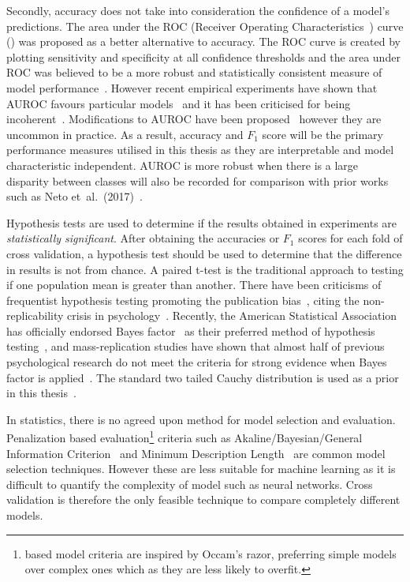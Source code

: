 \documentclass[12pt, twoside]{book}
\renewcommand\emph[1]{\textit{\color{USred}{#1}}}
\begin{document}
Secondly, accuracy does not take into consideration the confidence of a model's predictions. The area under the ROC (Receiver Operating Characteristics~\cite{rocauc}) curve (\emph{AUROC}) was proposed as a better alternative to accuracy. The ROC curve is created by plotting sensitivity and specificity at all confidence thresholds and the area under ROC was believed to be a more robust and statistically consistent measure of model performance~\cite{aucgood}. However recent empirical experiments have shown that AUROC favours particular models~\cite{aucmislead2} and it has been criticised for being incoherent~\cite{aucmislead, aucincoherent}. Modifications to AUROC have been proposed~\cite{aucmislead2, aucincoherent} however they are uncommon in practice. As a result, accuracy and $F_1$ score will be the primary performance measures utilised in this thesis as they are interpretable and model characteristic independent. AUROC is more robust when there is a large disparity between classes will also be recorded for comparison with prior works such as Neto et~al.~(2017)~\cite{mpowerneto2017analysis}.


Hypothesis tests are used to determine if the results obtained in experiments are \textit{statistically significant}. After obtaining the accuracies or $F_1$ scores for each fold of cross validation, a hypothesis test should be used to determine that the difference in results is not from chance. A paired t-test is the traditional approach to testing if one population mean is greater than another. There have been criticisms of frequentist hypothesis testing promoting the publication bias~\cite{publicationbias}, citing the non-replicability crisis in psychology~\cite{replicability}. Recently, the American Statistical Association has officially endorsed Bayes factor~\cite{bayesianttests} as their preferred method of hypothesis testing~\cite{bayesfactorASA}, and mass-replication studies have shown that almost half of previous psychological research do not meet the criteria for strong evidence when Bayes factor is applied~\cite{bayesfactorempirical}. The standard two tailed Cauchy distribution is used as a prior in this thesis~\cite{bayesianttests}.


In statistics, there is no agreed upon method for model selection and evaluation. Penalization based evaluation\footnote{\emph{Penalization} based model criteria are inspired by Occam's razor, preferring simple models over complex ones which as they are less likely to overfit.}  criteria such as Akaline/Bayesian/General Information Criterion~\cite{aicbic,generalinfocriteriongic} and Minimum Description Length~\cite{mindescriptionlength} are common model selection techniques. However these are less suitable for machine learning as it is difficult to quantify the complexity of model such as neural networks. Cross validation is therefore the only feasible technique to compare completely different models. 
 
\end{document}
